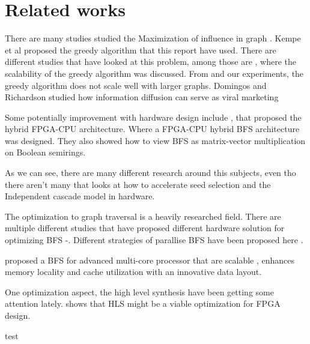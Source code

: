 \chapter{Related works}
There are many studies studied the Maximization of influence in graph \cite{MaximizeSpread2003}.  Kempe et al proposed the greedy algorithm that this report have used. There are different studies that have looked at this problem, among those are \cite{InfluenceMax}, where the scalability of the greedy algorithm was discussed. From \cite{InfluenceMax} and our experiments, the greedy algorithm does not scale well with larger graphs. Domingos and Richardson studied how information diffusion can serve as viral marketing \cite{ViralMarketing}

Some potentially improvement with hardware design include \cite{HybridBFS2015}, that proposed the hybrid FPGA-CPU architecture. Where a FPGA-CPU hybrid BFS architecture was designed. They also showed how to view BFS as matrix-vector multiplication on Boolean semirings. 

As we can see, there are many different research around this subjects, even tho there aren't many that looks at how to accelerate seed selection and the Independent cascade model in hardware.

The optimization to graph traversal is a heavily researched field. There are multiple different studies that have proposed different hardware solution for optimizing BFS \cite{ScalableGraphEx}-\cite{DirectOptimizeBFS}. Different strategies of parallise BFS have been proposed here \cite{ParallelBFS2011}. 

\cite{ScalableGraphEx} proposed a BFS for advanced multi-core processor that are scalable , enhances memory locality and cache utilization with an innovative data layout.

One optimization aspect, the high level synthesis have been getting some attention lately. \cite{HLSready2015} shows that HLS might be a viable optimization for FPGA design. 


test